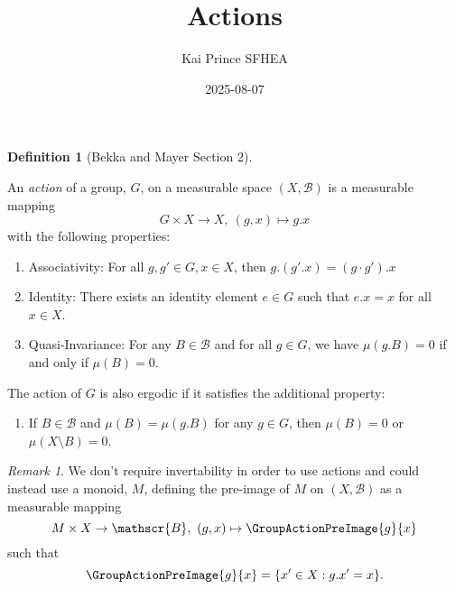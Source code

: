 \documentclass[
  british,
]{article}
\title{Actions}
\author{Kai Prince SFHEA}
\date{2025-08-07}
\providecommand{\tightlist}{%
  \setlength{\itemsep}{0pt}\setlength{\parskip}{0pt}}
\renewcommand*\contentsname{Table of contents}
\newcommand\contentsname{Table of contents}
\theoremstyle{definition}
\newtheorem{definition}{Definition}[section]
\theoremstyle{remark}
\newtheorem{refremark}{Remark}[section]
\newcommand{\Measure}{{\mu}}
\newcommand{\GroupAction}[2]{{#1}.{#2}}
\newcommand{\GroupElement}{{g}}
\newcommand{\MonoidElement}{{g}}
\newcommand{\Monoid}{{M}}
\newcommand{\GroupIdentity}{{e}}
\newcommand{\SigmaAlgebra}[1]{{\mathscr{#1}}}
\newcommand{\GroupOperation}[2]{{#1}\cdot{#2}}
\newcommand{\Group}{{G}}
\begin{document}
\maketitle

\renewcommand*\contentsname{Table of contents}
{
\hypersetup{linkcolor=}
\setcounter{tocdepth}{3}
\tableofcontents
}

\begin{definition}[Bekka and Mayer
 Section
2]\protect\hypertarget{def-action}{}\label{def-action}

An \emph{action} of a group, \(\Group\), on a measurable space
\((X,\SigmaAlgebra{B})\) is a measurable mapping
\[\Group\times X\rightarrow X,\ (\GroupElement,x)\mapsto \GroupAction{\GroupElement}{x} \]
with the following properties:

\begin{enumerate}
\def\labelenumi{\arabic{enumi}.}
\tightlist
\item
  Associativity: For all
  \(\GroupElement,\GroupElement'\in \Group,x\in X\), then
  \(\GroupAction{\GroupElement}{(\GroupAction{\GroupElement'}{x})}=\GroupAction{(\GroupOperation{\GroupElement}{\GroupElement'})}{x}\)
\item
  Identity: There exists an identity element \(\GroupIdentity\in\Group\)
  such that \(\GroupAction{\GroupIdentity}{x}=x\) for all \(x\in X\).
\item
  Quasi-Invariance: For any \(B\in\SigmaAlgebra{B}\) and for all
  \(\GroupElement\in\Group\), we have
  \(\Measure(\GroupAction{\GroupElement}{B})=0\) if and only if
  \(\Measure(B)=0\).
\end{enumerate}

The action of \(\Group\) is also ergodic if it satisfies the additional
property:

\begin{enumerate}
\def\labelenumi{\arabic{enumi}.}
\setcounter{enumi}{3}
\tightlist
\item
  If \(B\in\SigmaAlgebra{B}\) and
  \(\Measure(B)=\Measure(\GroupAction{\GroupElement}{B})\) for any
  \(\GroupElement\in\Group\), then \(\Measure(B)=0\) or
  \(\Measure(X\setminus B)=0\).
\end{enumerate}

\end{definition}

\begin{refremark}
We don't require invertability in order to use actions and could instead
use a monoid, \(\Monoid\), defining the pre-image of \(\Monoid\) on
\((X,\SigmaAlgebra{B})\) as a measurable mapping
\[\Monoid\times X\rightarrow \SigmaAlgebra{B},\ (\MonoidElement,x)\mapsto \GroupActionPreImage{\MonoidElement}{x} \]
such that
\[\GroupActionPreImage{\MonoidElement}{x}=\{x'\in X: \GroupAction{\MonoidElement}{x'}=x \}. \]

\label{rem-MonoidAction}

\end{refremark}
\end{document}
